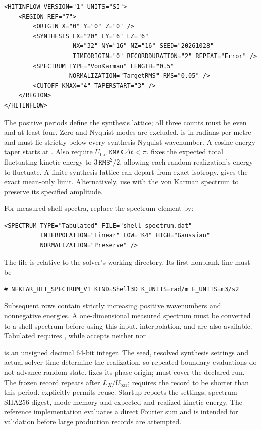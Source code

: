 \begin{lstlisting}[style=XMLStyle]
<HITINFLOW VERSION="1" UNITS="SI">
    <REGION REF="7">
        <ORIGIN X="0" Y="0" Z="0" />
        <SYNTHESIS LX="20" LY="6" LZ="6"
                   NX="32" NY="16" NZ="16" SEED="20261028"
                   TIMEORIGIN="0" RECORDDURATION="2" REPEAT="Error" />
        <SPECTRUM TYPE="VonKarman" LENGTH="0.5"
                  NORMALIZATION="TargetRMS" RMS="0.05" />
        <CUTOFF KMAX="4" TAPERSTART="3" />
    </REGION>
</HITINFLOW>
\end{lstlisting}

The positive periods define the synthesis lattice; all three counts must be
even and at least four. Zero and Nyquist modes are excluded.  is
in radians per metre and must lie strictly below every synthesis Nyquist
wavenumber. A cosine energy taper starts at . Also require
$U_{\mathrm{bar}}\,\mathtt{KMAX}\,\Delta t<\pi$.
 fixes the expected total fluctuating kinetic energy to
$3\,\mathtt{RMS}^2/2$, allowing each random realization's energy to fluctuate.
A finite synthesis lattice can depart from exact isotropy.
 gives the exact mean-only limit.
Alternatively, use  with
the von Karman spectrum to preserve its specified amplitude.

For measured shell spectra, replace the spectrum element by:
\begin{lstlisting}[style=XMLStyle]
<SPECTRUM TYPE="Tabulated" FILE="shell-spectrum.dat"
          INTERPOLATION="Linear" LOW="K4" HIGH="Gaussian"
          NORMALIZATION="Preserve" />
\end{lstlisting}
The file is relative to the solver's working directory. Its first nonblank
line must be
\begin{lstlisting}
# NEKTAR_HIT_SPECTRUM_V1 KIND=Shell3D K_UNITS=rad/m E_UNITS=m3/s2
\end{lstlisting}
Subsequent rows contain strictly increasing positive wavenumbers and
nonnegative energies. A one-dimensional measured spectrum must be converted
to a shell spectrum before using this input.  interpolation,
 and  are also available. Tabulated
 requires , while  accepts neither
 nor .

 is an unsigned decimal 64-bit integer. The seed, resolved
synthesis settings and actual solver time determine the realization, so
repeated boundary evaluations do not advance random state.
 fixes its phase origin;  must cover
the declared run. The frozen record repeats after $L_X/U_{\mathrm{bar}}$;
 requires the record to be shorter than this period.
 explicitly permits reuse. Startup reports the settings, spectrum
SHA256 digest, mode memory and expected and realized kinetic energy.
The reference implementation evaluates a direct Fourier sum and is intended
for validation before large production records are attempted.

